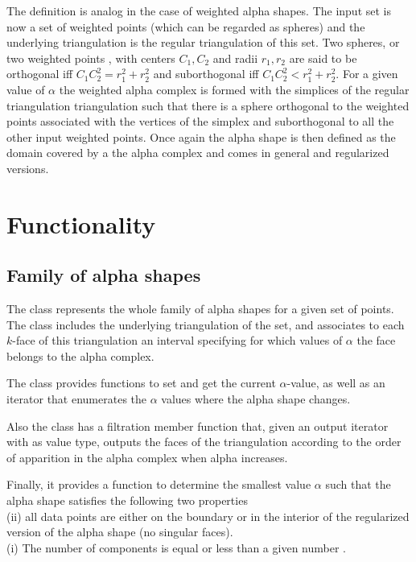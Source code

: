 The definition is analog in the case of weighted alpha shapes.
The input set is now a set of weighted points (which can be regarded
as spheres) and the underlying triangulation 
is the regular triangulation of this set.
Two spheres, or two weighted points , with centers $C_1, C_2$
and  radii $r_1, r_2 $ are said to be orthogonal iff 
$ C_1C_2 ^2 = r_1^2 + r_2^2$ and suborthogonal
iff  $ C_1C_2 ^2 < r_1^2 + r_2^2$.
For a given value of $\alpha$
the weighted alpha complex is formed with the simplices of the 
regular triangulation triangulation
such that there is a sphere orthogonal to the weighted points associated
with the vertices of the simplex  and suborthogonal to all the other
input weighted points. Once again the alpha shape is then defined as
the domain covered by a the alpha complex and comes in general and
regularized versions.





\section{Functionality \label{I1_SectAlpha_Shape_3}}

\subsection{Family of alpha shapes}

The class  represents the whole
family of alpha shapes for a given set of points.
The class includes  the underlying triangulation 
of the set,  and associates to each $k$-face of this triangulation
 an interval specifying 
for which values of $\alpha$ the face belongs to the
alpha complex. 

The class provides functions to set and
get the current $\alpha$-value, as well as an iterator that enumerates
the $\alpha$ values where the alpha shape changes.

Also the class has a filtration member function that, given
an  output iterator with 
as value  type, outputs the faces of the triangulation 
according to the 
order of apparition in the alpha complex when alpha increases.
  

Finally, it provides a function to determine 
the smallest value $\alpha$
such that the alpha shape   satisfies the following two properties~\\
(ii) all data points are either on the boundary or in the interior 
   of the regularized version of the alpha shape  (no singular faces). \\
(i) The number of components is equal or less  than a given  number .

